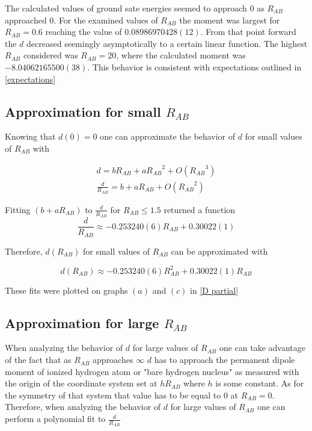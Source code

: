 \documentclass{pracalicmgr}
\begin{document}

The calculated values of ground sate energies seemed to approach $0$ as $R_{AB}$ approached $0$. For the examined values of $R_{AB}$ the moment was largest for $R_{AB} = 0.6$ reaching the value of $0.08986970428(12)$. From that point forward the $d$ decreased seemingly asymptotically to a certain linear function. The highest $R_{AB}$ considered was $R_{AB} = 20$, where the calculated moment was $-8.04062165500(38)$. This behavior is consistent with expectations outlined in \ref{expectations}

\subsection*{Approximation for small $R_{AB}$}

Knowing that $d\left(0\right) = 0$ one can approximate the behavior of $d$ for small values of $R_{AB}$ with

\begin{align*} 
    d = b {R_{AB}} + a {R_{AB}}^2  + O\left({R_{AB}}^{3}\right)\\
    \frac{d}{R_{AB}} = b  + a {R_{AB}} + O\left({R_{AB}}^{2}\right)
\end{align*}

Fitting $\left(b  + a {R_{AB}}\right)$ to $\frac{d}{R_{AB}}$ for $R_{AB} \leq 1.5$ returned a function
\begin{equation}
    \frac{d}{R_{AB}} \approx -0.253240(6)R_{AB}+0.30022(1)
\end{equation}

Therefore, $d\left({R_{AB}}\right)$ for small values of $R_{AB}$ can be approximated with

\begin{equation}
    d\left({R_{AB}}\right) \approx -0.253240(6)R_{AB}^2+0.30022(1)R_{AB}
    \label{smallD}
\end{equation}

These fits were plotted on graphs $(a)$ and $(c)$ in \ref{D partial}

\subsection*{Approximation for large $R_{AB}$}

When analyzing the behavior of $d$ for large values of $R_{AB}$ one can take advantage of the fact that as $R_{AB}$ approaches $\infty$ $d$ has to approach the permanent dipole moment of ionized hydrogen atom or "bare hydrogen nucleus" as measured with the origin of the coordinate system set at $hR_{AB}$ where $h$ is some constant. As for the symmetry of that system that value has to be equal to $0$ at $R_{AB} = 0$. Therefore, when analyzing the behavior of $d$ for large values of $R_{AB}$ one can perform a polynomial fit to $\frac{d}{R_{AB}}$ 
\end{document}
